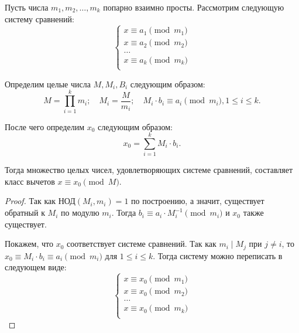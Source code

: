 \documentclass[a4paper]{article}
\theoremstyle{named}
\renewcommand{\gcd}{\text{НОД}}
\begin{document}
\begin{colloq}
        \begin{theorem*}
            Пусть числа $m_1, m_2, \dots, m_k$ попарно взаимно просты. Рассмотрим следующую систему сравнений:
            \begin{equation*}
                \begin{cases}
                    x \equiv a_1 \pmod{m_1} \\
                    x \equiv a_2 \pmod{m_2} \\
                    \dots \\
                    x \equiv a_k \pmod{m_k} \\
                \end{cases}
            \end{equation*}

            Определим целые числа $M, M_i, B_i$ следующим образом:
            \begin{equation*}
                M = \prod_{i = 1}^k m_i; \quad
                M_i = \dfrac{M}{m_i}; \quad
                M_i \cdot b_i \equiv a_i \pmod{m_i}, 1 \leq i \leq k.
            \end{equation*}

            После чего определим $x_0$ следующим образом:
            \begin{equation*}
                x_0 = \sum_{i = 1}^k M_i \cdot b_i.
            \end{equation*}

            Тогда множество целых чисел, удовлетворяющих системе сравнений, составляет класс вычетов $x \equiv x_0 \pmod M$.
        \end{theorem*}

        \begin{proof}
            Так как $\gcd(M_i, m_i) = 1$ по построению, а значит, существует обратный к $M_i$ по модулю $m_i$. Тогда $b_i \equiv a_i \cdot M_i^{-1} \pmod{m_i}$ и $x_0$ также существует.

            Покажем, что $x_0$ соответствует системе сравнений. Так как $m_i \mid M_j$ при $j \neq i$, то $x_0 \equiv M_i \cdot b_i \equiv a_i \pmod{m_i}$ для $1 \leq i \leq k$. Тогда систему можно переписать в следующем виде:
            \begin{equation*}
                 \begin{cases}
                    x \equiv x_0 \pmod{m_1} \\
                    x \equiv x_0 \pmod{m_2} \\
                    \dots \\
                    x \equiv x_0 \pmod{m_k} \\
                \end{cases}
            \end{equation*}


\end{proof}
\end{colloq}
\end{document}
